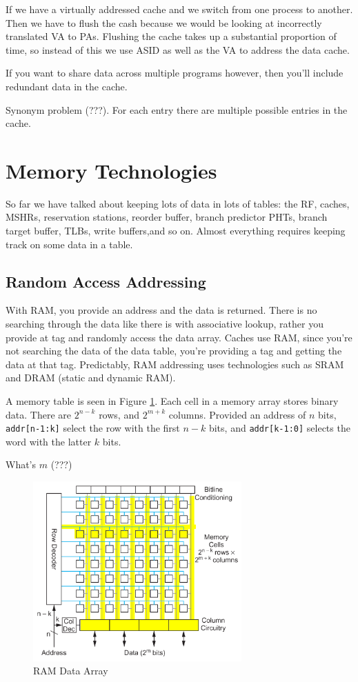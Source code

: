 \documentclass{article}
\begin{document}
If we have a virtually addressed cache and we switch from one process to another. Then we have to flush the cash because we would be looking at incorrectly translated VA to PAs. Flushing the cache takes up a substantial proportion of time, so instead of this we use ASID as well as the VA to address the data cache. 

If you want to share data across multiple programs however, then you'll include redundant data in the cache. 

Synonym problem (???). For each entry there are multiple possible entries in the cache. 

\section{Memory Technologies}

So far we have talked about keeping lots of data in lots of tables: the RF, caches, MSHRs, reservation stations, reorder buffer, branch predictor PHTs, branch target buffer, TLBs, write buffers,and so on. Almost everything requires keeping track on some data in a table.


\subsection{Random Access Addressing}

With RAM, you provide an address and the data is returned. There is no searching through the data like there is with associative lookup, rather you provide at tag and randomly access the data array. Caches use RAM, since you're not searching the data of the data table, you're providing a tag and getting the data at that tag. Predictably, RAM addressing uses technologies such as SRAM and DRAM (static and dynamic RAM). 

A memory table is seen in Figure \ref{fig:RAM}. Each cell in a memory array stores binary data. There are $2^{n-k}$ rows, and $2^{m+k}$ columns.  Provided an address of $n$ bits, \verb|addr[n-1:k]| select the row with the first $n-k$ bits, and \verb|addr[k-1:0]| selects the word with the latter $k$ bits.

What's $m$ (???)

\begin{figure}[ht!]
\centering
\includegraphics[width=80mm]{img/RAM.png}
\caption{RAM Data Array}
\label{fig:RAM}
\end{figure}
\end{document}
